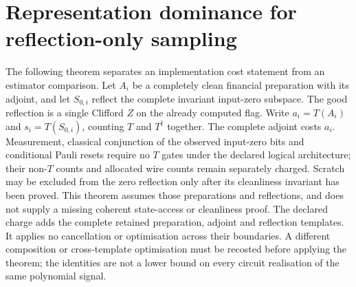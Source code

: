 \section{Representation dominance for reflection-only sampling}
\label{sec:representation-sampler-dominance}

The following theorem separates an implementation cost statement from an
estimator comparison. Let $A_i$ be a completely clean financial
preparation with its adjoint, and let $S_{0,i}$ reflect the complete
invariant input-zero subspace. The good reflection is a single Clifford
$Z$ on the already computed flag. Write $a_i=T(A_i)$ and
$s_i=T(S_{0,i})$, counting $T$ and $T^\dagger$ together. The complete
adjoint costs $a_i$. Measurement, classical conjunction of the observed
input-zero bits and conditional Pauli resets require no $T$ gates under
the declared logical architecture; their non-$T$ counts and allocated
wire counts remain separately charged. Scratch may be excluded from
the zero reflection only after its cleanliness invariant has been
proved. This theorem assumes those preparations and reflections, and
does not supply a missing coherent state-access or cleanliness proof.
The declared charge adds the complete retained preparation, adjoint and
reflection templates. It applies no cancellation or optimisation across
their boundaries. A different composition or cross-template optimisation
must be recosted before applying the theorem; the identities are not a
lower bound on every circuit realisation of the same polynomial signal.

